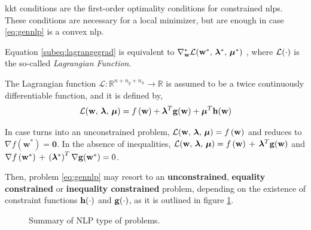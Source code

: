 \acrshort{kkt} conditions are the first-order optimality conditions for constrained \acrshort{nlp}s. These conditions are necessary for a local minimizer, but are enough in case \ref{eq:gennlp} is a convex \acrshort{nlp}.

Equation \eqref{subeq:lagrangegrad} is equivalent to $\nabla_\mathbf{w}^* \lagrangian{\mathbf{w}^*,\,\bm{\gmultiplier}^*,\,\bm{\hmultiplier}^*}$ , where $\mathcal{L}(\cdot)$ is  the so-called \textit{Lagrangian Function}.

\begin{definition}
The Lagrangian function $\mathcal{L}: \mathbb{R}^{n + n_g + n_h} \to \mathbb{R}$ is assumed to be a twice continuously differentiable function, and it is defined by,
\begin{equation}
\lagrangian{\mathbf{w},\,\bm{\gmultiplier},\,\bm{\hmultiplier}} = f\left(\mathbf{w}\right) + \bm{\gmultiplier}^T \eqCon{\mathbf{w}} + \bm{\hmultiplier}^T \ineqCon{\mathbf{w}}
\label{eq:lagrangianfunc}
\end{equation} 
\end{definition}
\begin{remark}
In case  turns into an unconstrained problem, $\lagrangian{\mathbf{w},\,\bm{\gmultiplier},\,\bm{\hmultiplier}} = f\left(\mathbf{w}\right)$ and  reduces to $\nabla f\left(\mathbf{w}^*\right) = \mathbf{0}$. In the absence of inequalities, $\lagrangian{\mathbf{w},\,\bm{\gmultiplier},\,\bm{\hmultiplier}} = f\left(\mathbf{w}\right) \, + \, \bm{\gmultiplier}^T \eqCon{\mathbf{w}}$ and $\nabla f\left(\mathbf{w}^*\right) \, + \, \left(\bm{\gmultiplier}^*\right)^T \nabla\eqCon{\mathbf{w}^*} = 0$.
\end{remark}
Then, problem \eqref{eq:gennlp} may resort to an \textbf{unconstrained}, \textbf{equality constrained} or \textbf{inequality constrained} problem, depending on the existence of constraint functions $\mathbf{h}(\cdot)$ and $\mathbf{g}(\cdot)$, as it is outlined in figure \ref{fig:nlptypeprob}.

\begin{figure}[h]
\centering
{}
\caption{Summary of NLP type of problems.}
\label{fig:nlptypeprob}
\end{figure}

